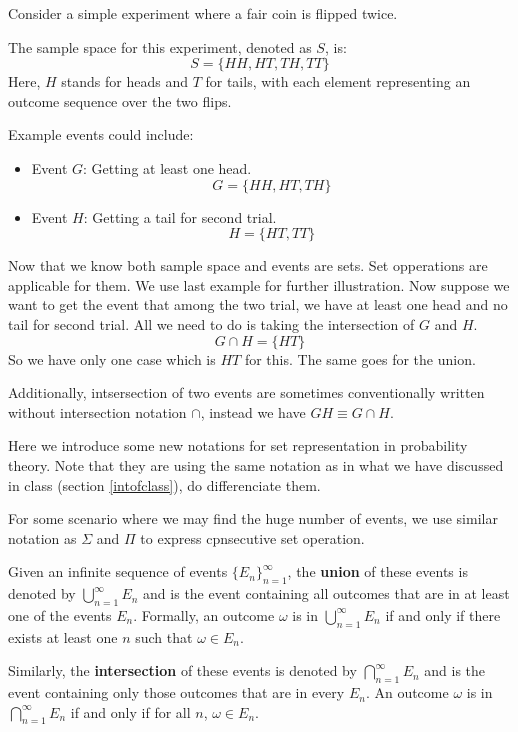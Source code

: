     \begin{example}
        Consider a simple experiment where a fair coin is flipped twice.

        The sample space for this experiment, denoted as \( S \), is:
        \[ S = \{HH, HT, TH, TT\} \]
        Here, \( H \) stands for heads and \( T \) for tails, with each element representing an outcome sequence over the two flips.

        Example events could include:
        \begin{itemize}
        \item Event \( G \): Getting at least one head.
        \[ G = \{HH, HT, TH\} \]
        \item Event \( H \): Getting a tail for second trial.
        \[ H = \{HT, TT\} \]
        \end{itemize}
    \end{example}

    Now that we know both sample space and events are sets. Set opperations are applicable for them.
    We use last example for further illustration. Now suppose we want to get the event that among
    the two trial, we have at least one head and no tail for second trial. All we need to do is taking
    the intersection of $G$ and $H$.
    \[G\cap H = \{HT\}\]
    So we have only one case which is $HT$ for this. The same goes for the union.

    \begin{remark}
        Additionally, intsersection of two events are sometimes conventionally written without 
        intersection notation $\cap$, instead we have $GH \equiv G\cap H$. 
    \end{remark}

    Here we introduce some new notations for set representation in probability theory. Note that they
    are using the same notation as in what we have discussed in class (section \ref{intofclass}), 
    do differenciate them.

    For some scenario where we may find the huge number of events, we use similar notation as $\Sigma$ and $\Pi$
    to express cpnsecutive set operation. 
    \begin{notation}
        Given an infinite sequence of events \( \{E_n\}_{n=1}^{\infty} \), the \textbf{union} of these events is denoted by \( \bigcup_{n=1}^{\infty} E_n \) and is the event containing all outcomes that are in at least one of the events \( E_n \). Formally, an outcome \( \omega \) is in \( \bigcup_{n=1}^{\infty} E_n \) if and only if there exists at least one \( n \) such that \( \omega \in E_n \).
        
        Similarly, the \textbf{intersection} of these events is denoted by \( \bigcap_{n=1}^{\infty} E_n \) and is the event containing only those outcomes that are in every \( E_n \). An outcome \( \omega \) is in \( \bigcap_{n=1}^{\infty} E_n \) if and only if for all \( n \), \( \omega \in E_n \).
    \end{notation}
    
